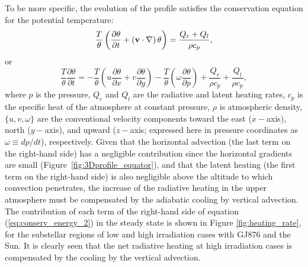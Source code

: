 \documentclass[11pt,numberedappendix,twocolappendix,]{emulateapj}
\begin{document}
To be more specific, the evolution of the profile satisfies the conservation equation for the potential temperature: 
\begin{equation}
\frac{T}{\theta } \left( \frac{\partial \theta }{\partial t} + ( {\bf v} \cdot \nabla ) \, \theta \right) = \frac{ Q_r + Q_l }{\rho c_p} ,   \label{eq:conserv_energy}
\end{equation}
or
\begin{equation}
\frac{T}{\theta } \frac{\partial \theta }{\partial t} = - \frac{T}{\theta }\left( u \frac{\partial \theta }{\partial x} + v\frac{\partial \theta }{\partial y} \right) -\frac{T}{\theta } \left(  \omega \frac{\partial \theta }{\partial p} \right)  + \frac{ Q_r }{\rho c_p} + \frac{ Q_l }{\rho c_p}, \label{eq:conserv_energy_2}
\end{equation}
where $p$ is the pressure, $Q_r$ and $Q_l$ are the radiative and latent heating rates, $c_p$ is the specific heat of the atmosphere at constant pressure, $\rho $ is atmospheric density, $\{ u, v, \omega \}$ are the conventional velocity components toward the east ($x-$axis), north ($y-$axis), and upward ($z-$axis; expressed here in pressure coordinates as $\omega \equiv dp/dt$), respectively. 
%
Given that the horizontal advection (the last term on the right-hand side) has a negligible contribution since the horizontal gradients are small (Figure~\ref{fig:3Dprofile_equator}), and that the latent heating (the first term on the right-hand side) is also negligible above the altitude to which convection penetrates, the increase of the radiative heating in the upper atmosphere must be compensated by the adiabatic cooling by vertical advection. %
The contribution of each term of the right-hand side of equation (\ref{eq:conserv_energy_2}) in the steady state is shown in Figure \ref{fig:heating_rate}, for the substellar regions of low and high irradiation cases with GJ876 and the Sun. %
It is clearly seen that the net radiative heating at high irradiation cases is compensated by the cooling by the vertical advection. 
\end{document}
